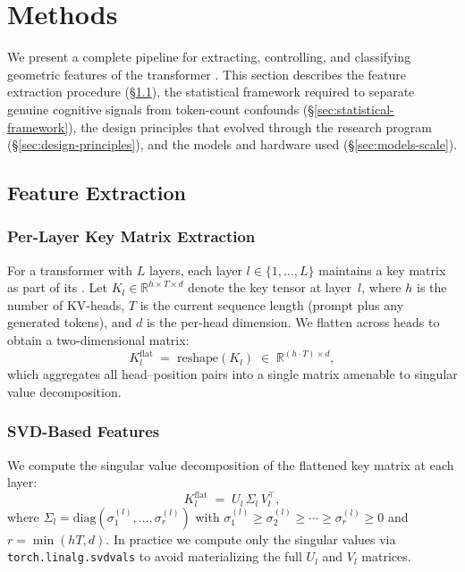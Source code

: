 \section{Methods}
\label{sec:methods}

We present a complete pipeline for extracting, controlling, and classifying geometric features of the transformer \kvcache.
This section describes the feature extraction procedure (\S\ref{sec:feature-extraction}), the statistical framework required to separate genuine cognitive signals from token-count confounds (\S\ref{sec:statistical-framework}), the design principles that evolved through the research program (\S\ref{sec:design-principles}), and the models and hardware used (\S\ref{sec:models-scale}).

\subsection{Feature Extraction}
\label{sec:feature-extraction}

\subsubsection{Per-Layer Key Matrix Extraction}

For a transformer with $L$ layers, each layer $l \in \{1, \ldots, L\}$ maintains a key matrix as part of its \kvcache.
Let $K_l \in \mathbb{R}^{h \times T \times d}$ denote the key tensor at layer~$l$, where $h$ is the number of KV-heads, $T$ is the current sequence length (prompt plus any generated tokens), and $d$ is the per-head dimension.
We flatten across heads to obtain a two-dimensional matrix:
\begin{equation}
  K_l^{\mathrm{flat}} \;=\; \mathrm{reshape}(K_l) \;\in\; \mathbb{R}^{(h \cdot T) \times d},
  \label{eq:kflat}
\end{equation}
which aggregates all head--position pairs into a single matrix amenable to singular value decomposition.

\subsubsection{SVD-Based Features}

We compute the singular value decomposition of the flattened key matrix at each layer:
\begin{equation}
  K_l^{\mathrm{flat}} \;=\; U_l \,\Sigma_l \,V_l^{\!\top},
  \label{eq:svd}
\end{equation}
where $\Sigma_l = \mathrm{diag}(\sigma_1^{(l)}, \ldots, \sigma_r^{(l)})$ with $\sigma_1^{(l)} \geq \sigma_2^{(l)} \geq \cdots \geq \sigma_r^{(l)} \geq 0$ and $r = \min(hT, d)$.
In practice we compute only the singular values via \texttt{torch.linalg.svdvals} to avoid materializing the full $U_l$ and $V_l$ matrices.

